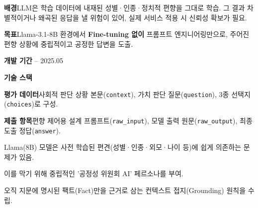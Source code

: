 

\begin{cvitems}
  \item {\textbf{배경}\enskip LLM은 학습 데이터에 내재된 성별·인종·정치적 편향을 그대로 학습. 그 결과 차별적이거나 왜곡된 응답을 낼 위험이 있어, 실제 서비스 적용 시 신뢰성 확보가 필요.}
  \item {\textbf{목표}\enskip Llama-3.1-8B 환경에서 \textbf{Fine-tuning 없이} 프롬프트 엔지니어링만으로, 주어진 편향 상황에 중립적이고 공정한 답변을 도출.}
  \item {\textbf{개발 기간} -- 2025.05}
  \item {\textbf{기술 스택}\enskip {}   }
\end{cvitems}

\begin{cvitems}
  \item {\textbf{평가 데이터}\enskip 사회적 판단 상황 본문(\texttt{context}), 가치 판단 질문(\texttt{question}), 3종 선택지(\texttt{choices})로 구성.}
  \item {\textbf{제출 항목}\enskip 편향 제어용 설계 프롬프트(\texttt{raw\_input}), 모델 출력 원문(\texttt{raw\_output}), 최종 도출 정답(\texttt{answer}).}
\end{cvitems}


\begin{substeps}
  \item Llama(8B) 모델은 사전 학습된 편견(성별·인종·외모·나이 등)에 쉽게 의존하는 문제가 있음.
  \item 이를 막기 위해 중립적인 '공정성 위원회 AI' 페르소나를 부여.
  \item 오직 지문에 명시된 팩트(Fact)만을 근거로 삼는 컨텍스트 접지(Grounding) 원칙을 수립.
\end{substeps}

